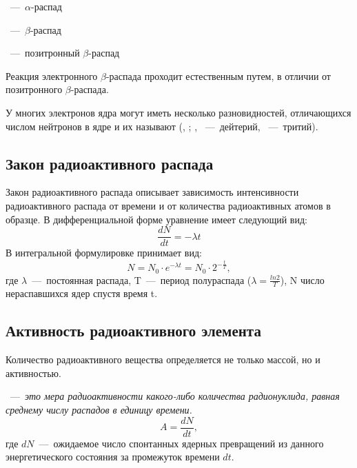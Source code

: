 \documentclass[a4paper, 14pt]{article}
\renewcommand{\emph}[1]{{\color{orange}{\textit{\textbf{#1}}}}}
\begin{document}
~---~$\alpha$-распад

~---~$\beta$-распад

~---~позитронный $\beta$-распад



Реакция электронного $\beta$-распада проходит естественным путем, в отличии от
позитронного $\beta$-распада.

У многих электронов ядра могут иметь несколько разновидностей,
отличающихся числом нейтронов в ядре и их называют \emph{изотопами} (, ; , ~---~дейтерий, ~---~тритий).

\subsection{Закон радиоактивного распада}
Закон радиоактивного распада описывает зависимость интенсивности радиоактивного распада от времени и от количества радиоактивных атомов в образце. В дифференциальной форме уравнение имеет следующий вид: 
\begin{equation}
    \frac{dN}{dt} = - \lambda t
\end{equation}
В интегральной формулировке принимает вид:
\begin{equation}
    N = N_0 \cdot e^{-\lambda t} = N_0 \cdot 2^{-\frac{t}{T}},
\end{equation}
где  $\lambda$~---~постоянная распада, T~---~период полураспада ($\lambda = \frac{ln2}{T}$), N число нераспавшихся ядер спустя время t.

\subsection{Активность радиоактивного элемента}
Количество радиоактивного вещества определяется не только массой, но и
активностью.

\emph{Активность (А)}~---~\textit{это мера радиоактивности какого-либо количества
радионуклида, равная среднему числу распадов в единицу времени.}
\begin{equation}
    A = \frac{dN}{dt},
\end{equation}
где $dN$~---~ожидаемое число спонтанных ядерных превращений из
данного энергетического состояния за промежуток времени $dt$.
\end{document}
